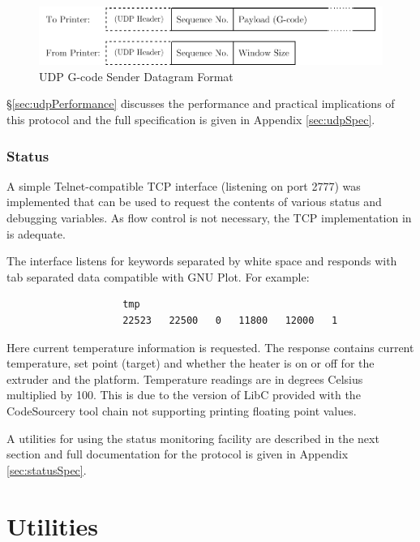 					\begin{figure}
						\includegraphics[width=1\textwidth]{diagrams/datagram.pdf}
						\caption{UDP G-code Sender Datagram Format}
						\label{fig:datagram}
					\end{figure}
					
					\S\ref{sec:udpPerformance} discusses the performance and practical
					implications of this protocol and the full specification is given in
					Appendix \ref{sec:udpSpec}.
			
			\subsubsection{Status}
				
				\label{sec:statusInterface}
				
				A simple Telnet-compatible TCP interface (listening on port 2777) was
				implemented that can be used to request the contents of various status
				and debugging variables. As flow control is not necessary, the TCP
				implementation in \uIP{} is adequate.
				
				The interface listens for keywords separated by white space and responds
				with tab separated data compatible with GNU Plot. For example:
				\begin{verbatim}
					tmp
					22523	22500	0	11800	12000	1
				\end{verbatim}
				Here current temperature information is requested. The response contains
				current temperature, set point (target) and whether the heater is on or
				off for the extruder and the platform. Temperature readings are in
				degrees Celsius multiplied by 100. This is due to the version of LibC
				provided with the CodeSourcery tool chain not supporting printing
				floating point values.
				
				A utilities for using the status monitoring facility are described in
				the next section and full documentation for the protocol is given in
				Appendix \ref{sec:statusSpec}.
	
	
	\section{Utilities}
		
